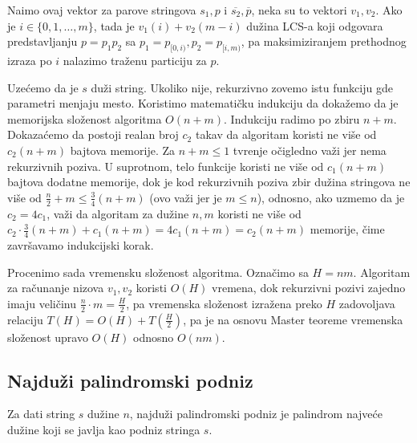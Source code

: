 

Na\dj imo ovaj vektor za parove stringova $s_1, p$ i $\overline{s_2}, \overline{p}$, neka su to vektori $v_1, v_2$. Ako je $i \in \{0, 1, \ldots, m\}$, tada je $v_1(i) + v_2(m-i)$ du\v zina LCS-a koji odgovara predstavljanju $p = p_1p_2$ sa $p_1 = p_{[0, i)}, p_2 = p_{[i, m)}$, pa maksimiziranjem prethodnog izraza po $i$ nalazimo tra\v zenu particiju za $p$.

\noindent
\begin{minipage}[l]{\textwidth}

\end{minipage}

Uze\' cemo da je $s$ du\v zi string. Ukoliko nije, rekurzivno zovemo istu funkciju gde parametri menjaju mesto. Koristimo matemati\v cku indukciju da doka\v zemo da je memorijska slo\v zenost algoritma $O(n+m)$. Indukciju radimo po zbiru $n+m$. Dokaza\' cemo da postoji realan broj $c_2$ takav da algoritam koristi ne vi\v se od $c_2(n+m)$ bajtova memorije. Za $n+m \leq 1$ tvr\dj enje o\v cigledno va\v zi jer nema rekurzivnih poziva. U suprotnom, telo funkcije koristi ne vi\v se od $c_1(n+m)$ bajtova dodatne memorije, dok je kod rekurzivnih poziva zbir du\v zina stringova ne vi\v se od $\frac{n}{2} + m \leq \frac{3}{4}(n+m)$ (ovo va\v zi jer je $m \leq n$), odnosno, ako uzmemo da je $c_2 = 4c_1$, va\v zi da algoritam za du\v zine $n,m$ koristi ne vi\v se od $c_2\cdot \frac{3}{4}(n+m) + c_1(n+m) = 4c_1(n+m) = c_2(n+m)$ memorije, \v cime zavr\v savamo indukcijski korak.

Procenimo sada vremensku slo\v zenost algoritma. Ozna\v cimo sa $H = nm$. Algoritam za ra\v cunanje nizova $v_1, v_2$ koristi $O(H)$ vremena, dok rekurzivni pozivi zajedno imaju veli\v cinu $\frac{n}{2}\cdot m = \frac{H}{2}$, pa vremenska slo\v zenost izra\v zena preko $H$ zadovoljava relaciju $T(H) = O(H) + T(\frac{H}{2})$, pa je na osnovu Master teoreme vremenska slo\v zenost upravo $O(H)$ odnosno $O(nm)$.

\subsection{Najdu\v zi palindromski podniz}

\begin{dfn}
Za dati string $s$ du\v zine $n$, najdu\v zi palindromski podniz je palindrom najve\' ce du\v zine koji se javlja kao podniz stringa $s$.
\end{dfn}

